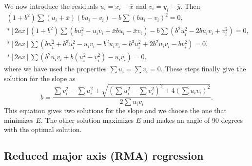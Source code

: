We now introduce the residuals $u_i = x_i - \bar{x}$ and $v_i = y_i - \bar{y}$.  Then
$$
\begin{array}{c}
\displaystyle (1 + b^2) \sum (u_i + \bar{x}) \left ( bu_i - v_i\right ) - b \sum \left (bu_i - v_i\right )^2 = 0, \\*[2ex]
\displaystyle (1 + b^2) \sum \left ( bu^2_i - u_i v_i  + \bar{x} bu_i - \bar{x} v_i \right ) - b\sum \left (b^2 u^2_i - 2b u_iv_i + v^2_i\right ) = 0, \\*[2ex]
\displaystyle \sum \left ( bu^2_i + b^3 u^2_i - u_iv_i - b^2 u_iv_i - b^3 u^2_i + 2b^2 u_iv_i - bv^2_i \right ) = 0, \\*[2ex]
\displaystyle \sum \left ( b^2u_iv_i + b (u^2_i - v^2_i)-u_i v_i \right ) = 0.
\end{array}
$$
where we have used the properties $\sum u_i = \sum v_i = 0$.  These steps finally give the solution for the slope as
\begin{equation}
b = \frac{\sum v^2_i - \sum u^2_i \pm \sqrt{(\sum u^2_i - \sum v^2_i)^2 + 4(\sum u_iv_i)^2}}{2 \sum u_iv_i}.
\end{equation}
This equation gives two solutions for the slope and we choose the one that minimizes $E$.  The other solution maximizes $E$ and
makes an angle of 90 degrees with the optimal solution.

\subsection{Reduced major axis (RMA) regression}

